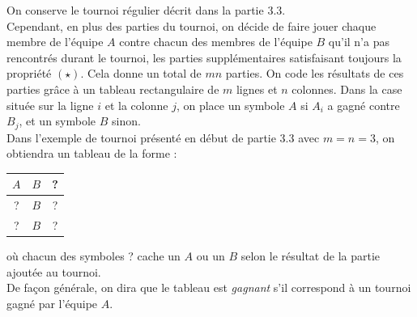 \documentclass[landscape,twocolumn,leqno,a4paper,10pt]{report} %
\newcommand\n{\noindent}
\begin{document}
\n On conserve le tournoi régulier décrit dans la partie $3.3$.\\
Cependant, en plus des parties du tournoi, on décide de faire jouer chaque membre de l'équipe $A$ contre chacun des membres de l'équipe $B$ qu'il n'a pas rencontrés durant le tournoi, les parties supplémentaires satisfaisant toujours la propriété $(\star)$. Cela donne un total de $m n$ parties. On code les résultats de ces parties grâce à un tableau rectangulaire de $m$ lignes et $n$ colonnes. Dans la case située sur la ligne $i$ et la colonne $j$, on place un symbole $A$ si $A_{i}$ a gagné contre $B_{j}$, et un symbole $B$ sinon.\\
Dans l'exemple de tournoi présenté en début de partie 3.3 avec $m=n=3$, on obtiendra un tableau de la forme :
\begin{center}
\begin{tabular}{|c|c|c|}
\hline
$A$ & $B$ & ? \\
\hline 
? & $B$ & ? \\
\hline 
? & $B$ & ? \\
\hline
\end{tabular}
\end{center}
où chacun des symboles ? cache un $A$ ou un $B$ selon le résultat de la partie ajoutée au tournoi.\\
De façon générale, on dira que le tableau est \textit{gagnant} s'il correspond à un tournoi gagné par l'équipe $A$.
\end{document}

